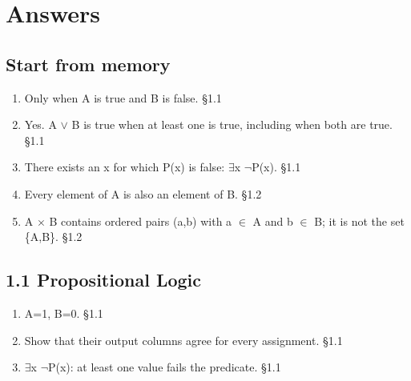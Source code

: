 \documentclass[11pt]{article}
\begin{document}
\clearpage
\section{Answers}
\begin{keepsection}\subsection{Start from memory}

\begin{enumerate}
\item Only when A is true and B is false. \hfill{\small\color{FAUblue}§1.1}
\item Yes. A \ensuremath{\lor} B is true when at least one is true, including when both are true. \hfill{\small\color{FAUblue}§1.1}
\item There exists an x for which P(x) is false: \ensuremath{\exists}x \ensuremath{\neg}P(x). \hfill{\small\color{FAUblue}§1.1}
\item Every element of A is also an element of B. \hfill{\small\color{FAUblue}§1.2}
\item A \ensuremath{\times} B contains ordered pairs (a,b) with a \ensuremath{\in} A and b \ensuremath{\in} B; it is not the set \{A,B\}. \hfill{\small\color{FAUblue}§1.2}
\end{enumerate}

\end{keepsection}
\begin{keepsection}\subsection{1.1 Propositional Logic}

\begin{enumerate}
\item A=1, B=0. \hfill{\small\color{FAUblue}§1.1}
\item Show that their output columns agree for every assignment. \hfill{\small\color{FAUblue}§1.1}
\item \ensuremath{\exists}x \ensuremath{\neg}P(x): at least one value fails the predicate. \hfill{\small\color{FAUblue}§1.1}
\end{enumerate}

\end{keepsection}
\end{document}
